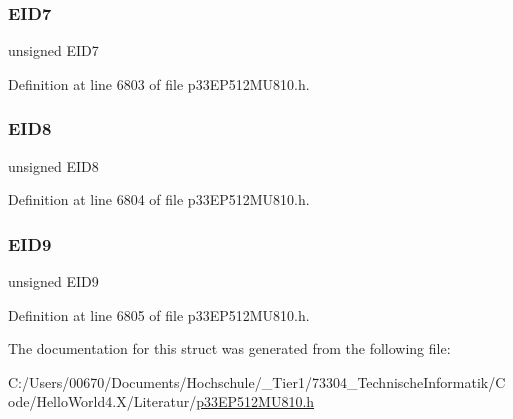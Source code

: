 \subsubsection{\texorpdfstring{E\+I\+D7}{EID7}}
{\footnotesize\ttfamily unsigned E\+I\+D7}



Definition at line 6803 of file p33\+E\+P512\+M\+U810.\+h.

\mbox{\label{structtag_c2_r_x_f10_e_i_d_b_i_t_s_acca25e0b7d86eb499d01f85222baea87}} 
\subsubsection{\texorpdfstring{E\+I\+D8}{EID8}}
{\footnotesize\ttfamily unsigned E\+I\+D8}



Definition at line 6804 of file p33\+E\+P512\+M\+U810.\+h.

\mbox{\label{structtag_c2_r_x_f10_e_i_d_b_i_t_s_ac6748f73d4ada8538b06548be4f396c2}} 
\subsubsection{\texorpdfstring{E\+I\+D9}{EID9}}
{\footnotesize\ttfamily unsigned E\+I\+D9}



Definition at line 6805 of file p33\+E\+P512\+M\+U810.\+h.



The documentation for this struct was generated from the following file\+:\begin{DoxyCompactItemize}
\item 
C\+:/\+Users/00670/\+Documents/\+Hochschule/\+\_\+\+Tier1/73304\+\_\+\+Technische\+Informatik/\+Code/\+Hello\+World4.\+X/\+Literatur/\hyperlink{p33_e_p512_m_u810_8h}{p33\+E\+P512\+M\+U810.\+h}\end{DoxyCompactItemize}
